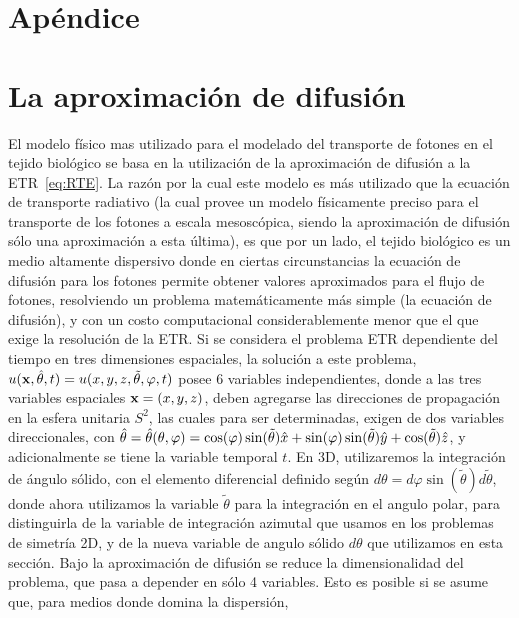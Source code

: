 \pagestyle{fancy}
\chapter*{Apéndice}
\lhead{\thepage}
\vspace{0.01\textheight}
\chapter{La aproximación de difusión}
\label{ap:ecdiff}

El modelo físico mas utilizado para el modelado del transporte de fotones en el 
tejido biológico se basa en la utilización de la aproximación de 
difusión a la ETR~\eqref{eq:RTE}. La razón por la cual este modelo es más utilizado 
que la ecuación de transporte radiativo (la cual 
provee un modelo físicamente preciso para el transporte de los fotones a escala mesoscópica, 
siendo la aproximación de difusión sólo una aproximación a esta última), es que 
por un lado, el tejido biológico es un medio 
altamente dispersivo donde en ciertas circunstancias la ecuación de difusión para los fotones permite obtener valores aproximados para el flujo de fotones, resolviendo un problema matemáticamente 
más simple (la ecuación de difusión), y con un costo computacional 
considerablemente menor que el que exige la resolución de la ETR. 
Si se considera el problema ETR dependiente del tiempo 
en tres dimensiones espaciales, la solución a este problema, $u(\mathbf{x},\hat{\theta},t)=u(x,y,z,\tilde{\theta},\varphi,t)$  
posee 6 variables independientes, donde a las tres variables espaciales $\mathbf{x}=(x,y,z)$, 
deben agregarse las direcciones de propagación en la esfera unitaria $S^2$, las 
cuales para ser determinadas, exigen de dos variables direccionales, con $\hat{\theta}=\hat{\theta}(\theta,\varphi)=\cos(\varphi)\sin(\tilde{\theta})\hat x+\sin(\varphi)\sin(\tilde{\theta})\hat y+\cos(\tilde{\theta}) \hat z$, y adicionalmente se tiene la variable temporal $t$. En 3D, utilizaremos 
la integración de ángulo sólido, con el elemento diferencial definido según 
$d\theta= d\varphi \sin(\tilde{\theta}) d\tilde{\theta}$, 
donde ahora utilizamos la variable $\tilde{\theta}$ para la integración en el angulo polar, 
para distinguirla de la variable de integración azimutal que usamos en los problemas de simetría 2D, y de la nueva variable de angulo sólido $d\theta$ que utilizamos en esta sección. Bajo la aproximación 
de difusión se reduce la dimensionalidad del problema, que pasa a depender en sólo 4 variables. 
Esto es posible si se asume que, para medios donde domina la dispersión, 
